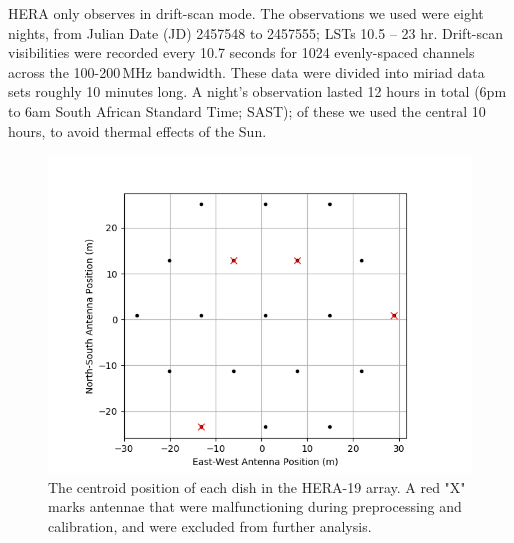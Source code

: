 HERA only observes in drift-scan mode. The observations we used were eight nights, from Julian Date (JD) 2457548 to 2457555; LSTs 10.5 -- 23 hr. Drift-scan visibilities were recorded every 10.7 seconds for 1024 evenly-spaced channels across the 100-200\,MHz bandwidth. These data were divided into {\sc miriad} data sets roughly 10 minutes long. A night's observation lasted 12 hours in total (6pm to 6am South African Standard Time; SAST); of these we used the central 10 hours, to avoid thermal effects of the Sun.

\begin{figure}
\centering
\hspace{-0.5cm}\includegraphics[scale=0.6]{chapters/eor_window_HERA/figures/antpos_hera19.png}
\caption[The centroid position of each dish in the HERA-19 array.]{The centroid position of each dish in the HERA-19 array.  A red "X" marks antennae that were malfunctioning during preprocessing and calibration, and were excluded from further analysis.}
\label{fig:hera19_antpos}
\end{figure}

